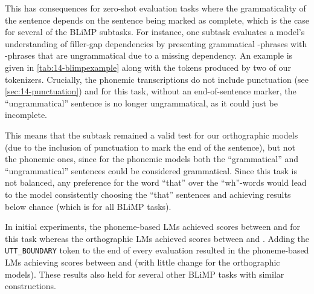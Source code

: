 This has consequences for zero-shot evaluation tasks where the grammaticality of the sentence depends on the sentence being marked as complete, which is the case for several of the BLiMP subtasks. For instance, one subtask evaluates a model's understanding of filler-gap dependencies by presenting grammatical -phrases with -phrases that are ungrammatical due to a missing dependency. An example is given in \cref{tab:14-blimpexample} along with the tokens produced by two of our tokenizers. Crucially, the phonemic transcriptions do not include punctuation (see \cref{sec:14-punctuation}) and for this task, without an end-of-sentence marker, the ``ungrammatical'' sentence is no longer ungrammatical, as it could just be incomplete.

This means that the subtask remained a valid test for our orthographic models (due to the inclusion of punctuation to mark the end of the sentence), but not the phonemic ones, since for the phonemic models both the ``grammatical'' and ``ungrammatical'' sentences could be considered grammatical. Since this task is not balanced, any preference for the word ``that'' over the ``wh''-words would lead to the model consistently choosing the ``that'' sentences and achieving results below chance (which is  for all BLiMP tasks).


In initial experiments, the phoneme-based LMs achieved scores between  and  for this task whereas the orthographic LMs achieved scores between  and . Adding the \texttt{UTT\_BOUNDARY} token to the end of every evaluation resulted in the phoneme-based LMs achieving scores between  and  (with little change for the orthographic models). These results also held for several other BLiMP tasks with similar constructions. 

